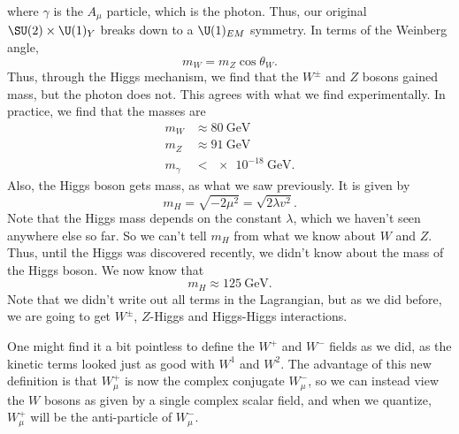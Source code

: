 \documentclass[a4paper]{article}
\begin{document}
where $\gamma$ is the $A_\mu$ particle, which is the photon. Thus, our original $\SU(2) \times \U(1)_Y$ breaks down to a $\U(1)_{EM}$ symmetry. In terms of the Weinberg angle,
\[
  m_W = m_Z \cos \theta_W.
\]
Thus, through the Higgs mechanism, we find that the $W^{\pm}$ and $Z$ bosons gained mass, but the photon does not. This agrees with what we find experimentally. In practice, we find that the masses are
\begin{align*}
  m_W &\approx \SI{80}{\giga\electronvolt}\\
  m_Z &\approx \SI{91}{\giga\electronvolt}\\
  m_\gamma &< \SI{e-18}{\giga\electronvolt}.
\end{align*}
Also, the Higgs boson gets mass, as what we saw previously. It is given by
\[
  m_H = \sqrt{-2 \mu^2} = \sqrt{2 \lambda v^2}.
\]
Note that the Higgs mass depends on the constant $\lambda$, which we haven't seen anywhere else so far. So we can't tell $m_H$ from what we know about $W$ and $Z$. Thus, until the Higgs was discovered recently, we didn't know about the mass of the Higgs boson. We now know that
\[
  m_H \approx \SI{125}{\giga\electronvolt}.
\]
Note that we didn't write out all terms in the Lagrangian, but as we did before, we are going to get $W^{\pm}$, $Z$-Higgs and Higgs-Higgs interactions.

One might find it a bit pointless to define the $W^+$ and $W^-$ fields as we did, as the kinetic terms looked just as good with $W^1$ and $W^2$. The advantage of this new definition is that $W_\mu^+$ is now the complex conjugate $W_\mu^-$, so we can instead view the $W$ bosons as given by a single complex scalar field, and when we quantize, $W_\mu^+$ will be the anti-particle of $W_\mu^-$.
\end{document}
